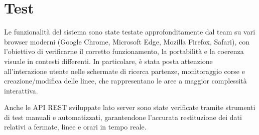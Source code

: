 \section{Test}

Le funzionalità del sistema sono state testate approfonditamente dal team su vari browser moderni (Google Chrome, Microsoft Edge, Mozilla Firefox, Safari), con l’obiettivo di verificarne il corretto funzionamento, la portabilità e la coerenza visuale in contesti differenti. In particolare, è stata posta attenzione all’interazione utente nelle schermate di ricerca partenze, monitoraggio corse e creazione/modifica delle linee, che rappresentano le aree a maggior complessità interattiva.

Anche le API REST sviluppate lato server sono state verificate tramite strumenti di test manuali e automatizzati, garantendone l’accurata restituzione dei dati relativi a fermate, linee e orari in tempo reale.

